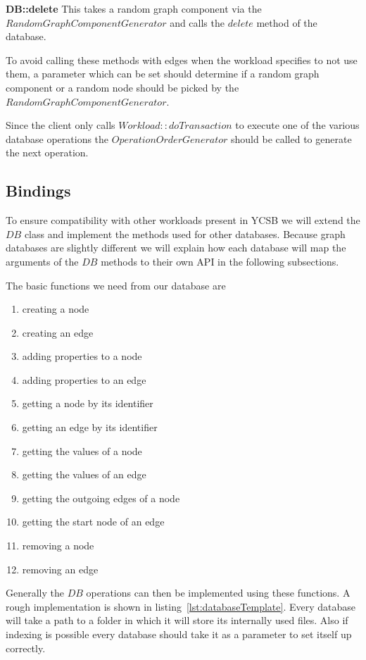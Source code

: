 \textbf{DB::delete} \newline
This takes a random graph component via the $ RandomGraphComponentGenerator $ and calls the $ delete $ method of the database.

To avoid calling these methods with edges when the workload specifies to not use them,
a parameter which can be set should determine if a random graph component or a random node should be picked by the $ RandomGraphComponentGenerator $.

Since the client only calls $ Workload::doTransaction $ to execute one of the various database operations the $ OperationOrderGenerator $ should be called to generate the next operation.

\subsection{Bindings}
To ensure compatibility with other workloads present in YCSB we will extend the $ DB $ class and implement the methods used for other databases.
Because graph databases are slightly different we will explain how each database will map the arguments of the $ DB $ methods to their own API in the following subsections.

The basic functions we need from our database are

\begin{enumerate}
  \item creating a node
  \item creating an edge
  \item adding properties to a node
  \item adding properties to an edge
  \item getting a node by its identifier
  \item getting an edge by its identifier
  \item getting the values of a node
  \item getting the values of an edge
  \item getting the outgoing edges of a node
  \item getting the start node of an edge
  \item removing a node
  \item removing an edge
\end{enumerate}

Generally the $ DB $ operations can then be implemented using these functions.
A rough implementation is shown in listing~\ref{lst:databaseTemplate}.
Every database will take a path to a folder in which it will store its internally used files.
Also if indexing is possible every database should take it as a parameter to set itself up correctly.

